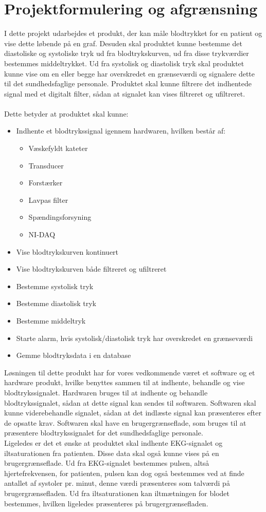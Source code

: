 \chapter{Projektformulering og afgrænsning}
I dette projekt udarbejdes et produkt, der kan måle blodtrykket for en patient og vise dette løbende på en graf. Desuden skal produktet kunne bestemme det diastoliske og systoliske tryk ud fra blodtrykskurven, ud fra disse trykværdier bestemmes middeltrykket. Ud fra systolisk og diastolisk tryk skal produktet kunne vise om en eller begge har overskredet en grænseværdi og signalere dette til det sundhedsfaglige personale. Produktet skal kunne filtrere det indhentede signal med et digitalt filter, sådan at signalet kan vises filtreret og ufiltreret.  \\\\
Dette betyder at produktet skal kunne:
\begin{itemize}
\item Indhente et blodtrykssignal igennem hardwaren, hvilken består af:
\begin{itemize}
\item Væskefyldt kateter
\item Transducer 
\item Forstærker
\item Lavpas filter
\item Spændingsforsyning
\item NI-DAQ
\end{itemize}
\item Vise blodtrykskurven kontinuert
\item Vise blodtrykskurven både filtreret og ufiltreret
\item Bestemme systolisk tryk
\item Bestemme diastolisk tryk
\item Bestemme middeltryk
\item Starte alarm, hvis systolisk/diastolisk tryk har overskredet en grænseværdi
\item Gemme blodtryksdata i en database
\end{itemize}
Løsningen til dette produkt har for vores vedkommende været et software og et hardware produkt, hvilke benyttes sammen til at indhente, behandle og vise blodtrykssignalet. Hardwaren bruges til at indhente og behandle blodtrykssignalet, sådan at dette signal kan sendes til softwaren. Softwaren skal kunne viderebehandle signalet, sådan at det indlæste signal kan præsenteres efter de opsatte krav. Softwaren skal have en brugergrænseflade, som bruges til at præsentere blodtrykssignalet for det sundhedsfaglige personale. \\
Ligeledes er det et ønske at produktet skal indhente EKG-signalet og iltsaturationen fra patienten. Disse data skal også kunne vises på en brugergrænseflade. Ud fra EKG-signalet bestemmes pulsen, altså hjertefrekvensen, for patienten, pulsen kan dog også bestemmes ved at finde antallet af systoler pr. minut, denne værdi præsenteres som talværdi på brugergrænsefladen. Ud fra iltsaturationen kan iltmætningen for blodet bestemmes, hvilken ligeledes præsenteres på brugergrænsefladen. 
